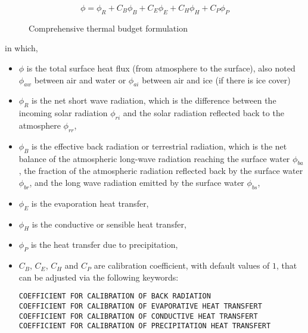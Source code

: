 \begin{equation} \label{eq:phi}
\phi = \phi_R + C_B \phi_B + C_E \phi_E + C_H \phi_H + C_P \phi_P
\end{equation}

\begin{figure}[H]
    \begin{center}
    \end{center}
    \caption{Comprehensive thermal budget formulation}
    \label{fig:full_budget}
\end{figure}

in which,
\begin{itemize}
	\item  $\phi$ is the total surface heat flux (from atmosphere to the surface), also noted $\phi_{aw}$ between air and water or $\phi_{ai}$ between air and ice (if there is ice cover)
	\item  $\phi_R$ is the net short wave radiation, which is the difference between the incoming solar radiation $\phi_{ri}$ and the solar radiation reflected back to the atmosphere  $\phi_{rr}$,
	\item  $\phi_B$ is the effective back radiation or terrestrial radiation, which is the net balance of the atmospheric long-wave radiation reaching the surface water $\phi_{ba}$, the fraction of the atmospheric radiation reflected back by the surface water $\phi_{br}$, and the long wave radiation emitted by the surface water $\phi_{bs}$,
	\item  $\phi_E$ is the evaporation heat transfer,
	\item  $\phi_H$ is the conductive or sensible heat transfer,
	\item  $\phi_P$ is the heat transfer due to precipitation,
    \item  $C_B$, $C_E$, $C_H$ and $C_P$ are calibration coefficient, with default values of $1$, that can be adjusted
    via the following keywords:
\begin{lstlisting}
COEFFICIENT FOR CALIBRATION OF BACK RADIATION
COEFFICIENT FOR CALIBRATION OF EVAPORATIVE HEAT TRANSFERT
COEFFICIENT FOR CALIBRATION OF CONDUCTIVE HEAT TRANSFERT
COEFFICIENT FOR CALIBRATION OF PRECIPITATION HEAT TRANSFERT
\end{lstlisting}
\end{itemize}

